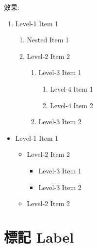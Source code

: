 \begin{itemize}
{    效果:
    \begin{enumerate}
      \item
      {
        Level-1 Item 1
        \begin{enumerate}
        \item Nested Item 1

        \item
        {
          Level-2 Item 2

          \begin{enumerate}
          \item
          {
            Level-3 Item 1

            \begin{enumerate}
            \item Level-4 Item 1
            \item Level-4 Item 2
            \end{enumerate}
          }

          \item Level-3 Item 2
          \end{enumerate}
        }
        \end{enumerate}
      }
    \end{enumerate}

    \begin{itemize}
      \item
      {
        Level-1 Item 1

        \begin{itemize}
        \item
        {
          Level-2 Item 2

          \begin{itemize}
          \item Level-3 Item 1
          \item Level-3 Item 2
          \end{itemize}
        }

        \item Level-2 Item 2
        \end{itemize}
      }
    \end{itemize}

  } %
\end{itemize}

\newpage
\section{標記 Label}

